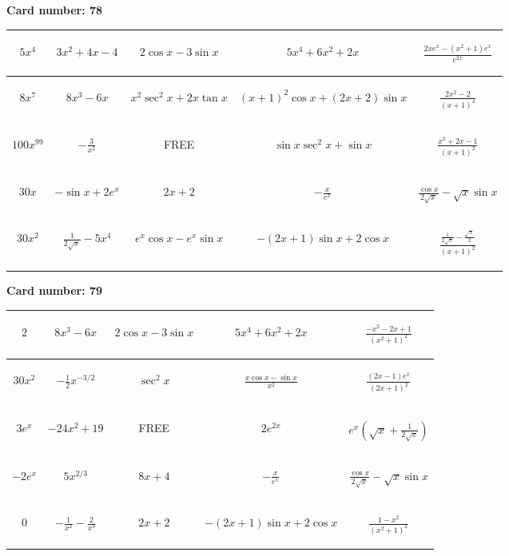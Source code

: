 \documentclass{article}
\newcommand{\entry}[1]{\begin{minipage}[t][2.75cm][t]{4cm} \vspace{1cm} \begin{center}#1\end{center} \end{minipage}}
\newcommand{\freespace}{\entry{FREE}}
\newcommand{\cardnumber}[1]{\noindent \textbf{Card number: #1} \bigskip}
\begin{document}
\pagebreak

\cardnumber{78}
\begin{center}
\begin{tabular}{|*{5}{c|}}
    \hline
    \entry{$5x^4$} & \entry{$3x^2 + 4x - 4$} & \entry{$2 \cos x - 3 \sin x$} & \entry{$5x^4 + 6x^2 + 2x$} & \entry{$\frac{2x e^x - (x^2 + 1) e^x}{e^{2x}}$} \\ \hline
    \entry{$8x^7$} & \entry{$8x^3 - 6x$} & \entry{$x^2 \sec^2 x + 2x \tan x$} & \entry{$(x + 1)^2 \cos x + (2x + 2) \sin x$} & \entry{$\frac{2x^2 - 2}{(x + 1)^4}$} \\ \hline
    \entry{$100x^{99}$} & \entry{$-\frac{3}{x^2}$} & \freespace & \entry{$\sin x \sec^2 x + \sin x$} & \entry{$\frac{x^2 + 2x - 1}{(x + 1)^2}$} \\ \hline
    \entry{$30x$} & \entry{$-\sin x + 2e^x$} & \entry{$2x + 2$} & \entry{$-\frac{x}{e^x}$} & \entry{$\frac{\cos x}{2 \sqrt{x}} - \sqrt{x} \sin x$} \\ \hline
    \entry{$30x^2$} & \entry{$\frac{1}{2\sqrt{x}} - 5x^4$} & \entry{$e^x \cos x - e^x \sin x$} & \entry{$-(2x + 1) \sin x + 2 \cos x$} & \entry{$\frac{\frac{1}{2 \sqrt{x}} - \frac{\sqrt{x}}{2}}{(x + 1)^2}$} \\ \hline
\end{tabular}
\end{center}

\pagebreak

\cardnumber{79}
\begin{center}
\begin{tabular}{|*{5}{c|}}
    \hline
    \entry{$2$} & \entry{$8x^3 - 6x$} & \entry{$2 \cos x - 3 \sin x$} & \entry{$5x^4 + 6x^2 + 2x$} & \entry{$\frac{-x^2 - 2x + 1}{(x^2 + 1)^2}$} \\ \hline
    \entry{$30x^2$} & \entry{$-\frac{1}{2} x^{-3/2}$} & \entry{$\sec^2 x$} & \entry{$\frac{x \cos x - \sin x}{x^2}$} & \entry{$\frac{(2x - 1) e^x}{(2x + 1)^2}$} \\ \hline
    \entry{$3e^x$} & \entry{$-24x^2 + 19$} & \freespace & \entry{$2e^{2x}$} & \entry{$e^x \left(\sqrt{x} + \frac{1}{2\sqrt{x}}\right)$} \\ \hline
    \entry{$-2e^x$} & \entry{$5x^{2/3}$} & \entry{$8x + 4$} & \entry{$-\frac{x}{e^x}$} & \entry{$\frac{\cos x}{2 \sqrt{x}} - \sqrt{x} \sin x$} \\ \hline
    \entry{$0$} & \entry{$-\frac{1}{x^2} - \frac{2}{x^3}$} & \entry{$2x + 2$} & \entry{$-(2x + 1) \sin x + 2 \cos x$} & \entry{$\frac{1 - x^2}{(x^2 + 1)^2}$} \\ \hline
\end{tabular}
\end{center}
\end{document}
